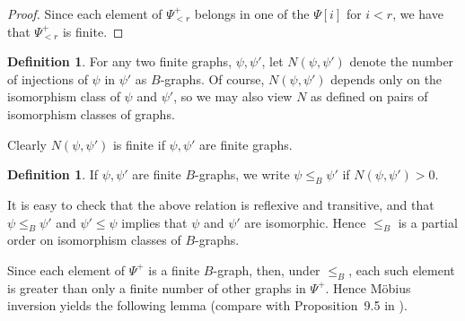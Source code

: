 \documentclass{memo-l}
\theoremstyle{plain}
\theoremstyle{definition}
\newtheorem{definition}[theorem]{Definition}
\numberwithin{section}{chapter}
\numberwithin{equation}{chapter}
\theoremstyle{plain}
\theoremstyle{definition}
\begin{document}
\begin{proof}
Since each element of $\Psi^+_{<r}$ belongs in one of the
$\Psi[i]$ for $i<r$, we have that $\Psi^+_{<r}$ is finite.
\end{proof}

\begin{definition}
For any two finite graphs, \( \psi,\psi' \), let \( N(\psi,\psi') \)
denote the number of injections of \( \psi \) in \( \psi' \) as \( B
\)-graphs.  Of course, $N(\psi,\psi')$ depends only on the
isomorphism class of $\psi$ and $\psi'$, so we may also view
$N$ as defined on pairs of isomorphism classes of graphs.
\end{definition}

Clearly $N(\psi,\psi')$ is finite if $\psi,\psi'$ are finite graphs.

\begin{definition}\label{de:B_graph_order}
If $\psi,\psi'$ are finite $B$-graphs, we write
$\psi\le_B\psi'$ if $N(\psi,\psi')>0$.
\end{definition}

It is easy to check that the above relation is 
reflexive and transitive, and that
$\psi\le_B\psi'$ and $\psi'\le \psi$ implies that
$\psi$ and $\psi'$ are isomorphic.
Hence $\le_B$ is a partial order on isomorphism classes of $B$-graphs.

Since each element of $\Psi^+$ is a finite $B$-graph, 
then, under $\le_B$, each such element is greater than only
a finite number of other graphs in $\Psi^+$.
Hence 
M\"obius inversion yields the following lemma (compare with
Proposition~9.5 in
\cite{friedman_alon}).  
\end{document}

